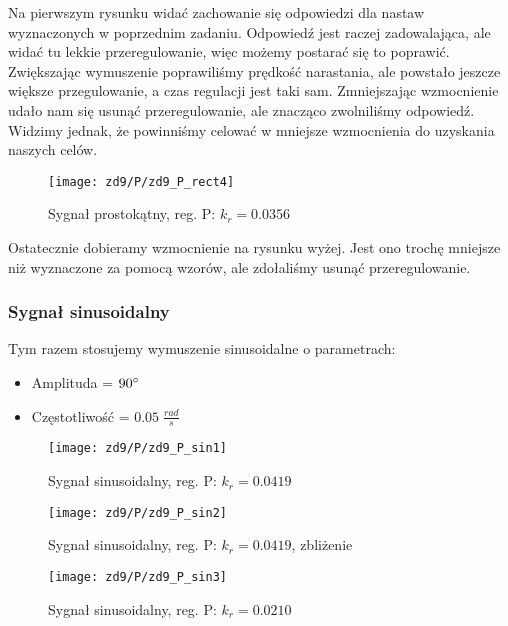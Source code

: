 \documentclass[11 pt]{article}
\begin{document}
Na pierwszym rysunku widać zachowanie się odpowiedzi dla nastaw wyznaczonych w poprzednim zadaniu. Odpowiedź jest raczej zadowalająca, ale widać tu lekkie przeregulowanie, więc możemy postarać się to poprawić. Zwiększając wymuszenie poprawiliśmy prędkość narastania, ale powstało jeszcze większe przegulowanie, a czas regulacji jest taki sam. Zmniejszając wzmocnienie udało nam się usunąć przeregulowanie, ale znacząco zwolniliśmy odpowiedź. Widzimy jednak, że powinniśmy celować w mniejsze wzmocnienia do uzyskania naszych celów.

\begin{figure}[h!]
	\centerline{
	\texttt{[image: zd9/P/zd9\_P\_rect4]}
	}
	\caption{Sygnał prostokątny, reg. P: $k_r = 0.0356$}
\end{figure}

Ostatecznie dobieramy wzmocnienie na rysunku wyżej. Jest ono trochę mniejsze niż wyznaczone za pomocą wzorów, ale zdołaliśmy usunąć przeregulowanie.

\newpage

\subsubsection*{Sygnał sinusoidalny}

Tym razem stosujemy wymuszenie sinusoidalne o parametrach:

\begin{itemize}
\item[]Amplituda = $90 \degree$
\item[]Częstotliwość = $0.05 \; \frac{rad}{s}$
\end{itemize}

\begin{figure}[h!]
	\centerline{
	\texttt{[image: zd9/P/zd9\_P\_sin1]}
	}
	\caption{Sygnał sinusoidalny, reg. P: $k_r = 0.0419$}
\end{figure}

\begin{figure}[h!]
	\centerline{
	\texttt{[image: zd9/P/zd9\_P\_sin2]}
	}
	\caption{Sygnał sinusoidalny, reg. P: $k_r = 0.0419$, zbliżenie}
\end{figure}

\newpage

\begin{figure}[h!]
	\centerline{
	\texttt{[image: zd9/P/zd9\_P\_sin3]}
	}
	\caption{Sygnał sinusoidalny, reg. P: $k_r = 0.0210$}
\end{figure}
\end{document}
